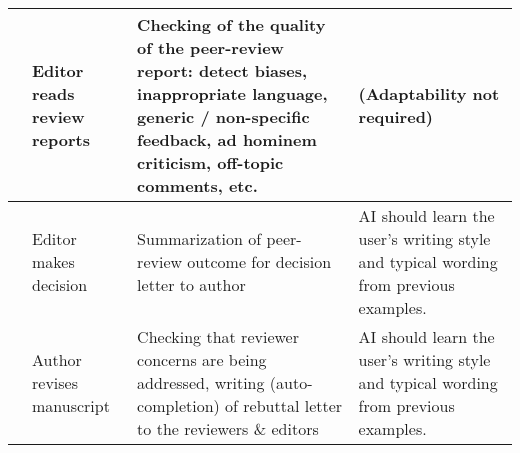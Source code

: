 \begin{landscape}
\begin{table}[htb]
\begin{tabularx}{\linewidth}{L{0.05} L{0.2} L{0.35} L{0.35}}
             & Editor reads review reports & Checking of the quality of the peer-review report: detect biases, inappropriate 
                language, generic / non-specific feedback, ad hominem criticism, off-topic comments, etc.  & (Adaptability not required) \\ 
            \midrule

             & Editor makes decision & Summarization of peer-review outcome for decision letter
                to author & AI should learn the user's writing style and typical wording from previous examples. \\ 
            \midrule

             & Author revises manuscript & Checking that reviewer concerns are being addressed, writing (auto-completion) of
                rebuttal letter to the reviewers \& editors & AI should learn the user's writing style and typical wording from previous examples. \\
            \bottomrule
        \end{tabularx}
    \end{table}
\end{landscape}


